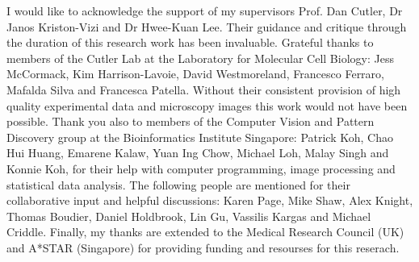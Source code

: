 \begin{acknowledgements}
I would like to acknowledge the support of my supervisors Prof. Dan Cutler, Dr Janos Kriston-Vizi and Dr Hwee-Kuan Lee. Their guidance and critique through the duration of this research work has been invaluable. Grateful thanks to members of the Cutler Lab at the Laboratory for Molecular Cell Biology: Jess McCormack, Kim Harrison-Lavoie, David Westmoreland, Francesco Ferraro, Mafalda Silva and Francesca Patella. Without their consistent provision of high quality experimental data and microscopy images this work would not have been possible. Thank you also to members of the Computer Vision and Pattern Discovery group at the Bioinformatics Institute Singapore: Patrick Koh, Chao Hui Huang, Emarene Kalaw, Yuan Ing Chow, Michael Loh, Malay Singh and Konnie Koh, for their help with computer programming, image processing and statistical data analysis. The following people are mentioned for their collaborative input and helpful discussions: Karen Page, Mike Shaw, Alex Knight, Thomas Boudier, Daniel Holdbrook, Lin Gu, Vassilis Kargas and Michael Criddle. Finally, my thanks are extended to the Medical Research Council (UK) and A*STAR (Singapore) for providing funding and resourses for this reserach.
\end{acknowledgements}
